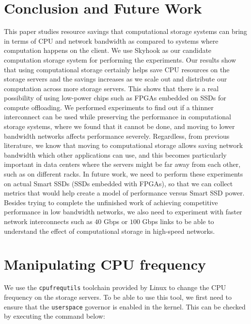 \documentclass[11pt]{article}
\newcommand{\code}[1]{\colorbox{light-gray}{\texttt{#1}}}
\begin{document}
\section{Conclusion and Future Work}
\label{sec:future-and-concl}
This paper studies resource savings that computational storage systems can bring in terms of CPU and network bandwidth as compared to systems where computation happens on the client. We use Skyhook as our candidate computation storage system for performing the experiments. Our results show that using computational storage certainly helps save CPU resources on the storage servers and the savings increases as we scale out and distribute our computation across more storage servers. This shows that there is a real possibility of using low-power chips such as FPGAs embedded on SSDs for compute offloading. We performed experiments to find out if a thinner interconnect can be used while preserving the performance in computational storage systems, where we found that it cannot be done, and moving to lower bandwidth networks affects performance severely. Regardless, from previous literature, we know that moving to computational storage allows saving network bandwidth which other applications can use, and this becomes particularly important in data centers where the servers might be far away from each other, such as on different racks. In future work, we need to perform these experiments on actual Smart SSDs (SSDs embedded with FPGAs), so that we can collect metrics that would help create a model of performance versus Smart SSD power. Besides trying to complete the unfinished work of achieving competitive performance in low bandwidth networks, we also need to experiment with faster network interconnects such as $40$ Gbps or $100$ Gbps links to be able to understand the effect of computational storage in high-speed networks.




\appendix

\section{Manipulating CPU frequency}
\label{sec:app-cpu}
We use the \code{cpufrequtils} toolchain provided by Linux to change the CPU frequency on the storage servers. To be able to use this tool, we first need to ensure that the \code{userspace} governor is enabled in the kernel. This can be checked by executing the command below:
\end{document}
